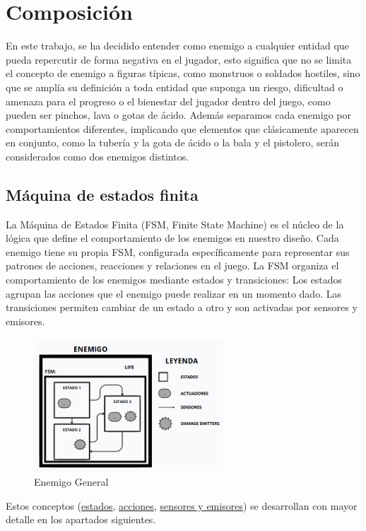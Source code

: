 \section{Composición}
En este trabajo, se ha decidido entender como enemigo a cualquier entidad que pueda repercutir de forma negativa en el jugador, esto significa que no se limita el concepto de enemigo a figuras típicas, como monstruos o soldados hostiles, sino que se amplía su definición a toda entidad que suponga un riesgo, dificultad o amenaza para el progreso o el bienestar del jugador dentro del juego, como pueden ser pinchos, lava o gotas de ácido.
Además separamos cada enemigo por comportamientos diferentes, implicando que elementos que clásicamente aparecen en conjunto, como la tubería y la gota de ácido o la bala y el pistolero, serán considerados como dos enemigos distintos.\\

\subsection{Máquina de estados finita}

La Máquina de Estados Finita (FSM, Finite State Machine) es el núcleo de la lógica que define el comportamiento de los enemigos en nuestro diseño. Cada enemigo tiene su propia FSM, configurada específicamente para representar sus patrones de acciones, reacciones y relaciones en el juego. La FSM organiza el comportamiento de los enemigos mediante estados y transiciones:
Los estados agrupan las acciones que el enemigo puede realizar en un momento dado.
Las transiciones permiten cambiar de un estado a otro y son activadas por sensores y emisores.\\

\begin{figure}[!h]
	\centering
	\includegraphics[height=5cm]{Imagenes/EnemigoGeneral.png}
	\caption{Enemigo General }
	\label{fig:EnemigoGeneral}
\end{figure}
Estos conceptos (\hyperref[subsec:estado]{estados}, \hyperref[subsec:acciones]{acciones}, \hyperref[subsec:sensores y emisores]{sensores y emisores}) se desarrollan con mayor detalle en los apartados siguientes.

